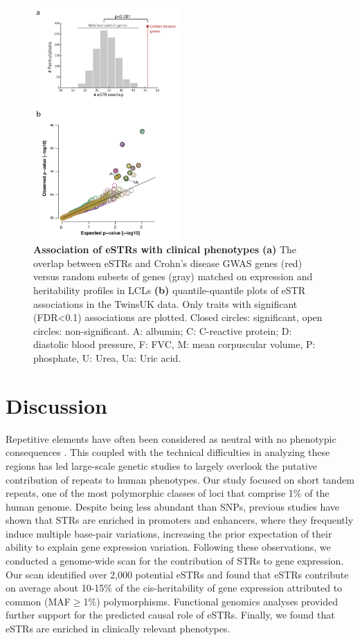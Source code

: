 \begin{figure}[h!]
\centering
\label{fig:estrfig5}
\includegraphics[width=0.5\textwidth]{Figures/Chapter4/Fig5}
\caption{\textbf{Association of eSTRs with clinical phenotypes} \textbf{(a)} The overlap between eSTRs and Crohn's disease GWAS genes (red) versus random subsets of genes (gray) matched on expression and heritability profiles in LCLs \textbf{(b)} quantile-quantile plots of eSTR associations in the TwinsUK data. Only traits with significant (FDR<0.1) associations are plotted. Closed circles: significant, open circles: non-significant. A: albumin; C: C-reactive protein; D: diastolic blood pressure, F: FVC, M: mean corpuscular volume, P: phosphate, U: Urea, Ua: Uric acid.}
\end{figure}

\section{Discussion}
Repetitive elements have often been considered as neutral with no phenotypic consequences \cite{GemayelChoBoeynaemsEtAl2012}. This coupled with the technical difficulties in analyzing these regions has led large-scale genetic studies to largely overlook the putative contribution of repeats to human phenotypes. Our study focused on short tandem repeats, one of the most polymorphic classes of loci that comprise 1\% of the human genome. Despite being less abundant than SNPs, previous studies have shown that STRs are enriched in promoters and enhancers, where they frequently induce multiple base-pair variations, increasing the prior expectation of their ability to explain gene expression variation. Following these observations, we conducted a genome-wide scan for the contribution of STRs to gene expression. Our scan identified over 2,000 potential eSTRs and found that eSTRs contribute on average about 10-15\% of the cis-heritability of gene expression attributed to common (MAF$\geq$1\%) polymorphisms. Functional genomics analyses provided further support for the predicted causal role of eSTRs. Finally, we found that eSTRs are enriched in clinically relevant phenotypes. 

